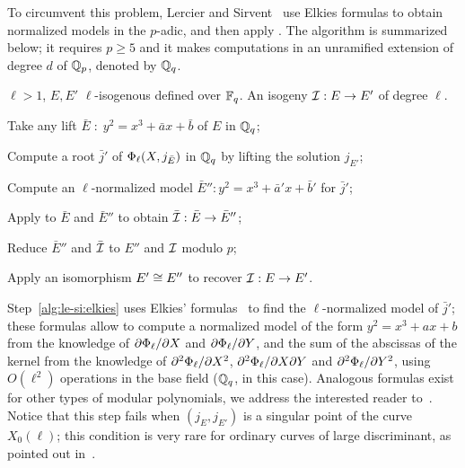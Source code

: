 To circumvent this problem, Lercier and
Sirvent~\cite{lercier+sirvent08} use Elkies formulas to obtain
normalized models in the $p$-adic, and then apply
. The algorithm is summarized below; it
requires $p\ge5$ and it makes computations in an unramified extension
of degree $d$ of $\mathbb{Q}_p$, denoted by $\mathbb{Q}_q$.

\begin{algorithm*}
  \caption{}
  \label{alg:le-si}
  \begin{algorithmic}[1]
    \REQUIRE $\ell>1$, $E,E'$ $\ell$-isogenous defined over $\mathbb{F}_q$.
    \ENSURE An isogeny $\mathcal{I}:E\rightarrow E'$ of degree $\ell$.

    \STATE \label{alg:le-si:lift1}Take any lift
    $\bar{E}\;:\;y^2=x^3+\bar{a}x+\bar{b}$ of $E$ in $\mathbb{Q}_q$;
    
    \STATE \label{alg:le-si:modpol}Compute a root $\bar{j}'$ of
    $\Phi_\ell(X,j_{\bar{E}})$ in $\mathbb{Q}_q$ by lifting the solution
    $j_{E'}$;
    
    \STATE \label{alg:le-si:elkies} Compute an $\ell$-normalized model
    $\bar{E}'':y^2=x^3+\bar{a}'x+\bar{b}'$ for $\bar{j}'$;
    
    \STATE \label{alg:le-si:bmss}Apply  to $\bar{E}$ and
    $\bar{E}''$ to obtain $\bar{\mathcal{I}}:\bar{E}\rightarrow\bar{E}''$;
    
    \STATE \label{alg:le-si:reduce}Reduce $\bar{E}''$ and $\bar{\mathcal{I}}$
    to $E''$ and $\mathcal{I}$ modulo $p$;
    
    \STATE \label{alg:le-si:isom}Apply an isomorphism $E'\cong E''$ to
    recover $\mathcal{I}:E\rightarrow E'$.
  \end{algorithmic}
\end{algorithm*}

Step~\ref{alg:le-si:elkies} uses Elkies' formulas~\cite{elkies98} to
find the $\ell$-normalized model of $\bar{j}'$; these formulas allow
to compute a normalized model of the form $y^2=x^3+ax+b$ from the
knowledge of $\partial\Phi_\ell/\partial X$ and
$\partial\Phi_\ell/\partial Y$, and the sum of the abscissas of the
kernel from the knowledge of $\partial^2\Phi_\ell/\partial X^2$,
$\partial^2\Phi_\ell/\partial X\partial Y$ and
$\partial^2\Phi_\ell/\partial Y^2$, using $O(\ell^2)$ operations in
the base field ($\mathbb{Q}_q$, in this case). Analogous formulas exist for
other types of modular polynomials, we address the interested reader
to~\cite{schoof95,morain95,elkies98,lercier-algorithmique}. Notice
that this step fails when $(j_E,j_{E'})$ is a singular point of the
curve $X_0(\ell)$; this condition is very rare for ordinary curves of
large discriminant, as pointed out in~\cite[$\S7$]{schoof95}.

